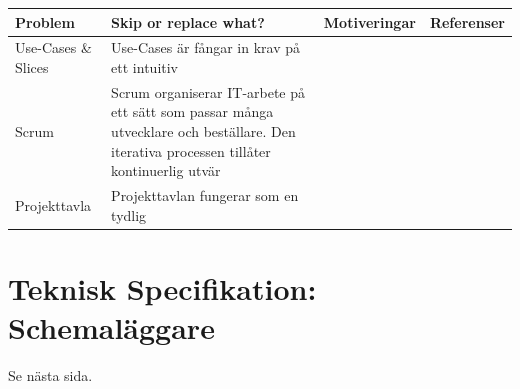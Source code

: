 \documentclass[conference,a4paper]{IEEEtran}
\newcommand\Tstrut{\rule{0pt}{2.6ex}}       %
\newcommand\Bstrut{\rule[-0.9ex]{0pt}{0pt}} %
\newcommand{\TBstrut}{\Tstrut\Bstrut} %
\begin{document}
\begin{table}[H]
	\small
  \centering
	\begin{tabular}{|p{1.5cm}|p{2cm}|p{1.8cm}|p{1.5cm}|} %
    \hline
    Problem & Skip or replace what? & Motiveringar & Referenser \TBstrut \\
    \hline
    Use-Cases \& Slices & Use-Cases är fångar in krav på ett intuitiv & & \TBstrut \\
    \hline
    Scrum & Scrum organiserar IT-arbete på ett sätt som passar många utvecklare och beställare. Den iterativa processen tillåter kontinuerlig utvär & & \TBstrut \\
    \hline
    Projekttavla & Projekttavlan fungerar som en tydlig & & \TBstrut \\
    \hline
  \end{tabular}
\end{table}

\section{Teknisk Specifikation: Schemaläggare}
Se nästa sida.
\newpage
\null%
\newpage


\end{document}
